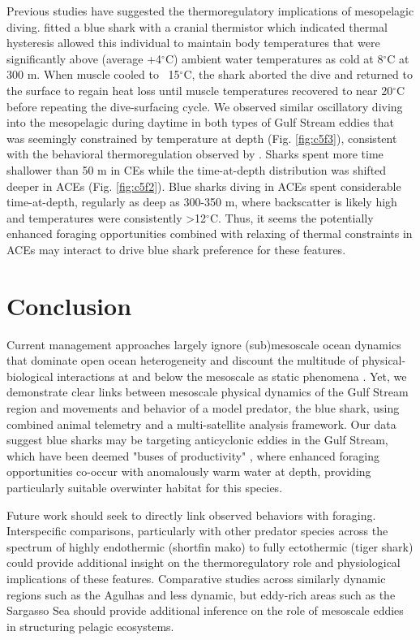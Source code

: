 Previous studies have suggested the thermoregulatory implications of mesopelagic diving. \citep{Carey1990} fitted a blue shark with a cranial thermistor which indicated thermal hysteresis allowed this individual to maintain body temperatures that were significantly above (average +4$^\circ$C) ambient water temperatures as cold at 8$^\circ$C at 300 m. When muscle cooled to ~15$^\circ$C, the shark aborted the dive and returned to the surface to regain heat loss until muscle temperatures recovered to near 20$^\circ$C before repeating the dive-surfacing cycle. We observed similar oscillatory diving into the mesopelagic during daytime in both types of Gulf Stream eddies that was seemingly constrained by temperature at depth (Fig. \cref{fig:c5f3}), consistent with the behavioral thermoregulation observed by \cite{Carey1990}. Sharks spent more time shallower than 50 m in CEs while the time-at-depth distribution was shifted deeper in ACEs (Fig. \cref{fig:c5f2}). Blue sharks diving in ACEs spent considerable time-at-depth, regularly as deep as 300-350 m, where backscatter is likely high \citep{Fennell2015} and temperatures were consistently >12$^\circ$C. Thus, it seems the potentially enhanced foraging opportunities combined with relaxing of thermal constraints in ACEs may interact to drive blue shark preference for these features.

\section{Conclusion}

Current management approaches largely ignore (sub)mesoscale ocean dynamics that dominate open ocean heterogeneity and discount the multitude of physical-biological interactions at and below the mesoscale as static phenomena \citep{Maxwell2015, Lewison2015}. Yet, we demonstrate clear links between mesoscale physical dynamics of the Gulf Stream region and movements and behavior of a model predator, the blue shark, using combined animal telemetry and a multi-satellite analysis framework. Our data suggest blue sharks may be targeting anticyclonic eddies in the Gulf Stream, which have been deemed "buses of productivity" \citep{Fennell2015}, where enhanced foraging opportunities co-occur with anomalously warm water at depth, providing particularly suitable overwinter habitat for this species. 

Future work should seek to directly link observed behaviors with foraging. Interspecific comparisons, particularly with other predator species across the spectrum of highly endothermic (\eg shortfin mako) to fully ectothermic (\eg tiger shark) could provide additional insight on the thermoregulatory role and physiological implications of these features. Comparative studies across similarly dynamic regions such as the Agulhas and less dynamic, but eddy-rich areas such as the Sargasso Sea should provide additional inference on the role of mesoscale eddies in structuring pelagic ecosystems. 


